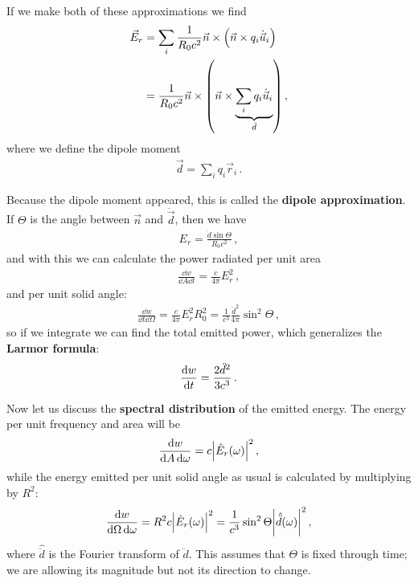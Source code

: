 \documentclass[main.tex]{subfiles}
\begin{document}
If we make both of these approximations we find 
%
\begin{align}
\vec{E}_r &= \sum _{i} \frac{1}{R_0 c^2} \vec{n} \times \qty(\vec{n} \times q_i \dot{\vec{u}}_i)  \\
&= \frac{1}{R_0 c^2} \vec{n} \times \qty(\vec{n} \times \underbrace{\sum _{i} q_i \dot{\vec{u}}_i}_{ \ddot{d}})
\,,
\end{align}
%
where we define the dipole moment 
%
\begin{align}
\vec{d} = \sum _{i} q_i \vec{r}_i
\,.
\end{align}

Because the dipole moment appeared, this is called the \textbf{dipole approximation}. 
If \(\Theta \) is the angle between \(\vec{n}\) and \(\ddot{\vec{d}}\), then we have 
%
\begin{align}
E_r = \frac{ \ddot{d}   \sin \Theta }{R_0 c^2}
\,,
\end{align}
%
and with this we can calculate the power radiated per unit area 
%
\begin{align}
\frac{ \dd{w}}{ \dd{A} \dd{t}} = \frac{c}{4 \pi } E_r^2
\,,
\end{align}
%
and per unit solid angle: 
%
\begin{align}
\frac{ \dd{w}}{ \dd{t} \dd{\Omega }}= \frac{c}{4 \pi } E_r^2 R_0^2
= \frac{1}{c^3} \frac{ \ddot{d}^2}{4 \pi } \sin^2\Theta 
\,,
\end{align}
%
so if we integrate we can find the total emitted power, which generalizes the \textbf{Larmor formula}: 
%
\begin{align} \label{eq:larmor-dipole}
\dv{w}{t}= \frac{2 \ddot{d}^2}{3 c^3}
\,.
\end{align}

Now let us discuss the \textbf{spectral distribution} of the emitted energy. The energy per unit frequency and area will be 
%
\begin{align}
\frac{ \dd{w}}{ \dd{A} \dd{\omega }} = c \abs{\hat{E}_r(\omega )}^2
\,,
\end{align}
%
while the energy emitted per unit solid angle as usual is calculated by multiplying by \(R^2\): 
%
\begin{align}
\frac{ \dd{w}}{ \dd{\Omega } \dd{\omega }} = R^2 c \abs{\hat{E}_r (\omega )}^2 = \frac{1}{c^3} \sin^2\Theta \abs{ \hat{\ddot{d}} (\omega )}^2
\,,
\end{align}
%
where \(\hat{ \ddot{d} }\) is the Fourier transform of \(\ddot{d}\). 
This assumes that \(\Theta \) is fixed through time; we are allowing its magnitude but not its direction to change. 
\end{document}
